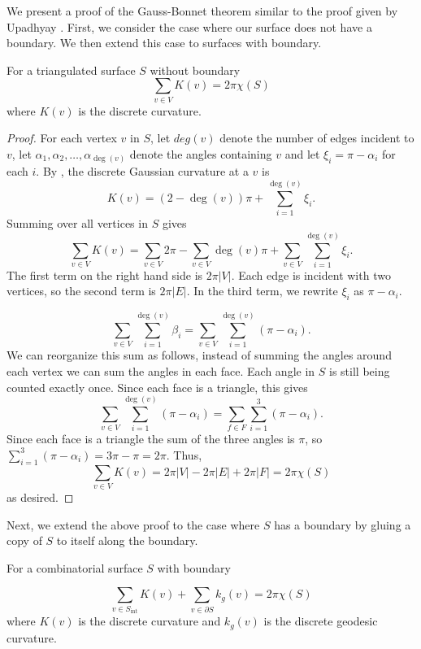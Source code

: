 We present a proof of the Gauss-Bonnet theorem similar to the proof given by Upadhyay \cite{upadhyay2015}.
First, we consider the case where our surface does not have a boundary.
We then extend this case to surfaces with boundary.
\begin{theorem}\label{thm:g-b-discete-bdy}
For a triangulated surface $S$ without boundary
$$\sum_{v\in V} K(v)=2\pi \chi(S)$$
where $K(v)$ is the discrete curvature.
\end{theorem}

\begin{proof}

For each vertex $v$ in $S$,
let $deg(v)$ denote the number of edges incident to $v$, let $\alpha_1,\alpha_2,\ldots,\alpha_{\deg{(v)}}$ denote the angles
containing $v$ and let $\xi_i=\pi-\alpha_i$ for each $i$.
By , 
the discrete Gaussian curvature at a $v$ is
 $$K(v)=(2-\deg{(v)})\pi +\sum_{i=1}^{\deg{(v)}} \xi_i.$$
Summing over all vertices in $S$ gives
$$\sum_{v\in V} K(v)=\sum_{v\in V}2\pi - \sum_{v\in V}\deg{(v)}\pi+\sum_{v\in V}\sum_{i=1}^{\deg{(v)}} \xi_i.$$
The first term on the right hand side is $2\pi |V|$. Each edge is incident with two vertices, so the second term is $2\pi |E|$. 
In the third term, we rewrite $\xi_i$ as $\pi-\alpha_i$.

$$ \sum_{v\in V}\sum_{i=1}^{\deg{(v)}} \beta_i= \sum_{v\in V}\sum_{i=1}^{\deg{(v)}} (\pi-\alpha_i).$$
We can reorganize this sum as follows, instead of summing the angles around each vertex we can sum the angles in each face.
Each angle in $S$ is still being counted exactly once. 
Since each face is a triangle, this gives
$$\sum_{v\in V}\sum_{i=1}^{\deg{(v)}} (\pi-\alpha_i)=\sum_{f\in F}\sum_{i=1}^3(\pi-\alpha_i).$$
Since each face is a triangle the sum of the three angles is $\pi$,
so $\sum_{i=1}^3(\pi-\alpha_i)=3\pi-\pi=2\pi.$
Thus, $$\sum_{v\in V} K(v)=2\pi |V|-2\pi |E|+2\pi |F|=2\pi \chi(S)$$ as desired.
\end{proof}

Next, we extend the above proof to the case where $S$ has a boundary
by gluing a copy of $S$ to itself along the boundary.

\begin{theorem}\label{thm:g-b-discete}
For a combinatorial surface $S$ with boundary

$$\sum_{v\in S_{\text{int}}} K(v)+\sum_{v\in\partial S}k_g(v)=2\pi \chi(S)$$
where $K(v)$ is the discrete curvature and $k_g(v)$ is the discrete geodesic curvature.
\end{theorem}

